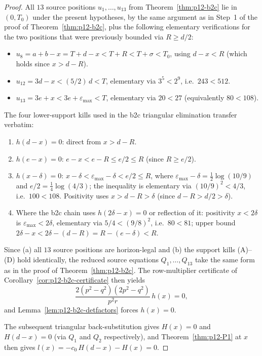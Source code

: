 \begin{proof}
All $13$ source positions $u_{1}, \ldots, u_{13}$ from
Theorem~\ref{thm:p12-b2c} lie in $(0, T_{0})$ under the present
hypotheses, by the same argument as in Step~1 of the proof of
Theorem~\ref{thm:p12-b2c}, plus the following elementary
verifications for the two positions that were previously bounded
via $R \ge d/2$:
\begin{itemize}
\item $u_{8} = a + b - x = T + d - x < T + R < T + \sigma < T_{0}$,
  using $d - x < R$ (which holds since $x > d - R$).
\item $u_{12} = 3d - x < (5/2)\, d < T$, elementary via
  $3^{5} < 2^{9}$, i.e.\ $243 < 512$.
\item $u_{13} = 3e + x < 3e + \varepsilon_{\max} < T$, elementary
  via $20 < 27$ (equivalently $80 < 108$).
\end{itemize}

The four lower-support kills used in the b2c triangular elimination
transfer verbatim:
\begin{enumerate}
\item[(A)] $h(d - x) = 0$: direct from $x > d - R$.
\item[(B)] $h(e - x) = 0$: $e - x < e - R \le e/2 \le R$ (since
  $R \ge e/2$).
\item[(C)] $h(x - \delta) = 0$: $x - \delta < \varepsilon_{\max} - \delta
  < e/2 \le R$, where
  $\varepsilon_{\max} - \delta = \tfrac12 \log(10/9)$ and
  $e/2 = \tfrac14 \log(4/3)$; the inequality is elementary via
  $(10/9)^{2} < 4/3$, i.e.\ $100 < 108$.  Positivity uses
  $x > d - R > \delta$ (since $d - R > d/2 > \delta$).
\item[(D)] Where the b2c chain uses $h(2\delta - x) = 0$ or
  reflection of it: positivity $x < 2\delta$ is
  $\varepsilon_{\max} < 2\delta$, elementary via $5/4 < (9/8)^{2}$,
  i.e.\ $80 < 81$; upper bound $2\delta - x < 2\delta - (d - R)
  = R - (e - \delta) < R$.
\end{enumerate}

Since (a) all $13$ source positions are horizon-legal and (b) the
support kills (A)--(D) hold identically, the reduced source
equations $Q_{1}, \ldots, Q_{13}$ take the same form as in the proof
of Theorem~\ref{thm:p12-b2c}.  The row-multiplier certificate of
Corollary~\ref{cor:p12-b2c-certificate} then yields
$$\frac{2(p^{2} - q^{2})(2p^{2} - q^{2})}{p^{2} r}\, h(x) = 0,$$
and Lemma~\ref{lem:p12-b2c-detfactors} forces $h(x) = 0$.

The subsequent triangular back-substitution gives $H(x) = 0$ and
$H(d - x) = 0$ (via $Q_{1}$ and $Q_{2}$ respectively), and
Theorem~\ref{thm:p12-P1} at $x$ then gives
$l(x) = -c_{0}\, H(d - x) - H(x) = 0$.
\end{proof}

